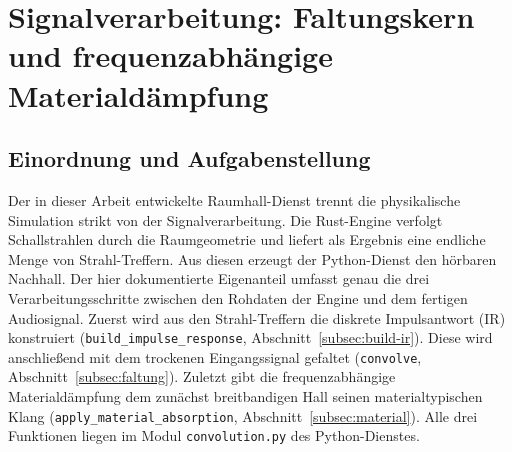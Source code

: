 %
%        
%
%   
%   
%   


\section{Signalverarbeitung: Faltungskern und frequenzabhängige Materialdämpfung}
\label{sec:python-dsp}

\subsection{Einordnung und Aufgabenstellung}
\label{subsec:dsp-einordnung}

Der in dieser Arbeit entwickelte Raumhall-Dienst trennt die physikalische
Simulation strikt von der Signalverarbeitung. Die Rust-Engine verfolgt
Schallstrahlen durch die Raumgeometrie und liefert als Ergebnis eine endliche
Menge von Strahl-Treffern. Aus diesen erzeugt der Python-Dienst den hörbaren
Nachhall. Der hier dokumentierte Eigenanteil umfasst genau die drei
Verarbeitungsschritte zwischen den Rohdaten der Engine und dem fertigen
Audiosignal. Zuerst wird aus den Strahl-Treffern die diskrete Impulsantwort (IR)
konstruiert (\texttt{build\_impulse\_response},
Abschnitt~\ref{subsec:build-ir}). Diese wird anschließend mit dem trockenen
Eingangssignal gefaltet (\texttt{convolve}, Abschnitt~\ref{subsec:faltung}).
Zuletzt gibt die frequenzabhängige Materialdämpfung dem zunächst breitbandigen
Hall seinen materialtypischen Klang (\texttt{apply\_material\_absorption},
Abschnitt~\ref{subsec:material}). Alle drei Funktionen liegen im Modul
\texttt{convolution.py} des Python-Dienstes.

